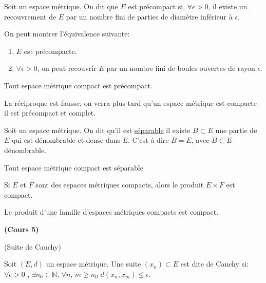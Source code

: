 \documentclass[12pt,a4paper]{article}
\begin{document}
\begin{flushleft}
\begin{mydef}
Soit \edm un espace métrique. On dit que $E$ est précompact si, $\forall \epsilon > 0$, il existe un recouvrement de $E$ par un nombre fini de parties de diamètre inférieur à $\epsilon$.
\end{mydef}

\begin{rem}
On peut montrer l'équivalence suivante:
\begin{enumerate}
\item $E$ est précompacte.
\item $\forall \epsilon > 0$, on peut recouvrir $E$ par un nombre fini de boules ouvertes de rayon $\epsilon$.
\end{enumerate}
\end{rem}

\begin{thm}
Tout espace métrique compact est précompact.
\end{thm}

\begin{rem}
La réciproque est fausse, on verra plus tard qu'un espace métrique est compacte \ssi il est précompact et complet.
\end{rem}

\begin{mydef}
Soit \edm un espace métrique. On dit qu'il est \underline{séparable} \ssi il existe $B \subset E$ une partie de $E$ qui est dénombrable et dense dans $E$. C'est-à-dire $\bar{B} = E$, avec $B \subset E$ dénombrable.
\end{mydef}

\begin{thm}
Tout espace métrique compact est séparable
\end{thm}


\begin{thm}
Si $E$ et $F$ sont des espaces métriques compacts, alors le produit $E \times F$ est compact.
\end{thm}

\begin{thm}
Le produit d'une famille d'espaces métriques compacts est compact.
\end{thm}






\textbf{(Cours 5)}

(Suite de Cauchy)
\begin{mydef}
Soit $(E,d)$ un espace métrique. Une suite $(x_n) \subset E$ est dite de Cauchy si:\\
$\forall \epsilon > 0$ , $\exists n_0 \in \mathbb{N}$, $\forall n$, $m \geq n_0$ $d(x_n , x_m) \leq \epsilon$.
\end{mydef}


\end{flushleft}
\end{document}
